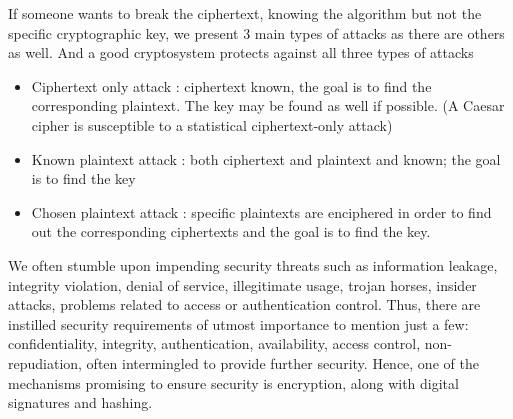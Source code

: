 If someone wants to break the ciphertext, knowing the algorithm but not the specific cryptographic key,  we present 3 main types of attacks as there are others as well. And a good cryptosystem protects against all three types of attacks \cite{stallings2017} 
\begin{itemize}
\item Ciphertext only attack : ciphertext known, the goal is to find the corresponding plaintext. The key may be found as well if possible. (A Caesar cipher is susceptible to a statistical ciphertext-only attack)
\end{itemize}
\begin{itemize}
\item Known plaintext attack : both ciphertext and plaintext and known; the goal is to find the key
\end{itemize}
\begin{itemize}
\item Chosen plaintext attack : specific plaintexts are enciphered in order to find out the corresponding ciphertexts and the goal is to find the key.
\end{itemize}


We often stumble upon impending security threats such as information leakage, integrity violation, denial of service, illegitimate usage, trojan horses, insider attacks, problems related to access or authentication control. 
Thus, there are instilled security requirements of utmost importance to mention just a few: confidentiality, integrity, authentication, availability, access control, non-repudiation, often intermingled to provide further security. Hence, one of the mechanisms promising to ensure security is encryption, along with digital signatures and hashing. 




